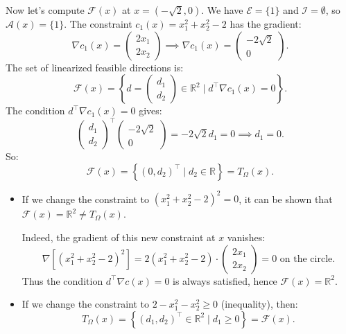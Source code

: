 Now let's compute $\mathcal{F}(x)$ at $x = (-\sqrt{2}, 0)$.
    We have $\mathcal{E} = \{1\}$ and $\mathcal{I} = \emptyset$, so $\mathcal{A}(x) = \{1\}$. 
    The constraint $c_1(x) = x_1^2 + x_2^2 - 2$ has the gradient:
    \begin{equation}
        \nabla c_1(x) = \begin{pmatrix} 2x_1 \\ 2x_2 \end{pmatrix} \implies \nabla c_1(x) = \begin{pmatrix} -2\sqrt{2} \\ 0 \end{pmatrix}.
    \end{equation}
    The set of linearized feasible directions is:
    \begin{equation}
        \mathcal{F}(x) = \left\{ d = \begin{pmatrix} d_1 \\ d_2 \end{pmatrix} \in \mathbb{R}^2 \mid d^\top \nabla c_1(x) = 0 \right\}.
    \end{equation}
    The condition $d^\top \nabla c_1(x) = 0$ gives:
    \begin{equation}
        \begin{pmatrix} d_1 \\ d_2 \end{pmatrix}^\top \begin{pmatrix} -2\sqrt{2} \\ 0 \end{pmatrix} = -2\sqrt{2} d_1 = 0 \implies d_1 = 0.
    \end{equation}
    So:
    \begin{equation}
        \mathcal{F}(x) = \left\{ (0, d_2)^\top \mid d_2 \in \mathbb{R} \right\} = T_\Omega(x).
    \end{equation}

\begin{remarque}
    \begin{itemize}
        \item If we change the constraint to $(x_1^2 + x_2^2 - 2)^2 = 0$, it can be shown that $\mathcal{F}(x) = \mathbb{R}^2 \neq T_\Omega(x)$.
        
        Indeed, the gradient of this new constraint at $x$ vanishes:
        \[ \nabla \left[ (x_1^2 + x_2^2 - 2)^2 \right] = 2(x_1^2 + x_2^2 - 2) \cdot \begin{pmatrix} 2x_1 \\ 2x_2 \end{pmatrix} = 0 \text{ on the circle.} \]
        Thus the condition $d^\top \nabla c(x) = 0$ is always satisfied, hence $\mathcal{F}(x) = \mathbb{R}^2$.
        
        \item If we change the constraint to $2 - x_1^2 - x_2^2 \geq 0$ (inequality), then:
        \begin{equation}
            T_\Omega(x) = \left\{ (d_1, d_2)^\top \in \mathbb{R}^2 \mid d_1 \geq 0 \right\} = \mathcal{F}(x).
        \end{equation}
    \end{itemize}
\end{remarque}

